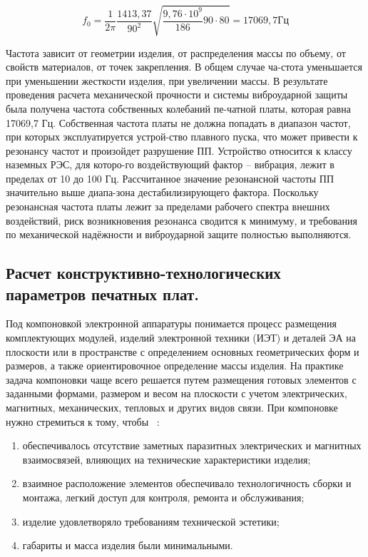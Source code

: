 $$f_0= \frac{1}{2\pi}\frac{1413,37}{90^2}\sqrt{\frac{9,76 \cdot 10^9}{186} 90 \cdot 80}=17069,7Гц$$

Частота зависит от геометрии изделия, от распределения массы по
объему, от свойств материалов, от точек закрепления. В общем случае
ча-стота уменьшается при уменьшении жесткости изделия, при увеличении
массы.  В результате проведения расчета механической прочности и
системы виброударной защиты была получена частота собственных
колебаний пе-чатной платы, которая равна 17069,7 Гц. Собственная
частота платы не должна попадать в диапазон частот, при которых
эксплуатируется устрой-ство плавного пуска, что может привести к
резонансу частот и произойдет разрушение ПП. Устройство относится к
классу наземных РЭС, для которо-го воздействующий фактор – вибрация,
лежит в пределах от 10 до 100 Гц. Рассчитанное значение резонансной
частоты ПП значительно выше диапа-зона дестабилизирующего фактора.
Поскольку резонансная частота платы лежит за пределами рабочего
спектра внешних воздействий, риск возникновения резонанса сводится к
минимуму, и требования по механической надёжности и виброударной
защите полностью выполняются.


\subsection{Расчет конструктивно-технологических параметров печатных плат. }

Под компоновкой электронной аппаратуры понимается процесс размещения
комплектующих модулей, изделий электронной техники (ИЭТ) и деталей ЭА
на плоскости или в пространстве с определением основных геометрических
форм и размеров, а также ориентировочное определение массы изделия.
На практике задача компоновки чаще всего решается путем размещения
готовых элементов с заданными формами, размером и весом на плоскости с
учетом электрических, магнитных, механических, тепловых и других видов
связи. При компоновке нужно стремиться к тому, чтобы ~\cite{Kostukevich2012}:
\begin{enumerate}
\item обеспечивалось отсутствие заметных паразитных электрических и магнитных взаимосвязей,
  влияющих на технические характеристики изделия;
  
\item взаимное расположение элементов обеспечивало технологичность сборки и монтажа,
  легкий доступ для контроля, ремонта и обслуживания;
  
\item изделие удовлетворяло требованиям технической эстетики;
\item габариты и масса изделия были минимальными.
\end{enumerate}

